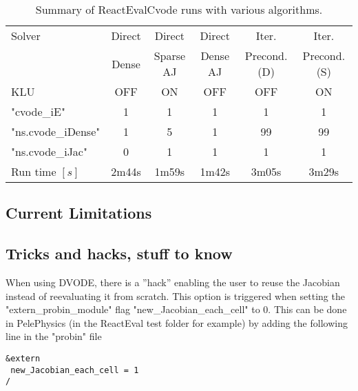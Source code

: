 \documentclass[12pt]{article}
\begin{document}
\begin{table}
\centering
\begin{tabular}{l c c c c c}
\hline 
Solver                   & Direct               & Direct               & Direct                         & Iter.                      &   Iter.      \\
                             & Dense              & Sparse AJ             & Dense AJ                  & Precond. (D)               & Precond. (S)    \\
KLU                      &     OFF              &   ON                  & OFF                               & OFF                   &  ON              \\
\hline 
"cvode_iE"              & 1                      &     1                     & 1                                    & 1                        &  1      \\
"ns.cvode_iDense" & 1                      &    5                      & 1                                    & 99                      &  99 \\ 
"ns.cvode_iJac"      & 0                      &    1                      & 1                                    & 1                        &  1 \\ 
\hline
Run time $[s]$      &  2m44s           & 1m59s                      & 1m42s                           & 3m05s                    &  3m29s   \\
\end{tabular}
\caption{Summary of ReactEvalCvode runs with various algorithms.}
\label{Tab::RunsReactEvalCvode}
\end{table}


\subsection{Current Limitations}

\subsection{Tricks and hacks, stuff to know}
\label{subs::Tricks}
When using DVODE, there is a ''hack'' enabling the user to reuse the Jacobian instead of reevaluating it from scratch. This option is triggered when setting the "extern_probin_module" flag "new_Jacobian_each_cell" to 0. This can be done in PelePhysics (in the ReactEval test folder for example) by adding the following line in the "probin" file
\begin{verbatim}
&extern
 new_Jacobian_each_cell = 1                                                                                                           
/
\end{verbatim}
\end{document}
